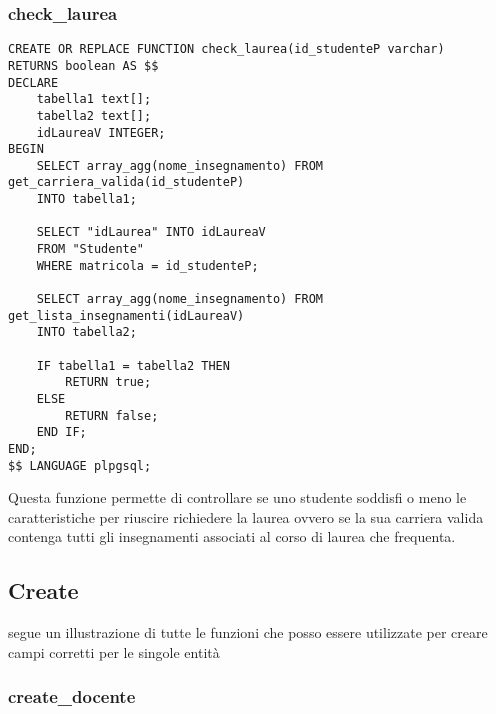 \subsubsection{check\_laurea}\label{docenteInsegnamento}
\begin{lstlisting}[style=sqlStyle]
CREATE OR REPLACE FUNCTION check_laurea(id_studenteP varchar)
RETURNS boolean AS $$
DECLARE
    tabella1 text[];
    tabella2 text[];
    idLaureaV INTEGER;
BEGIN 
    SELECT array_agg(nome_insegnamento) FROM get_carriera_valida(id_studenteP)
    INTO tabella1;
    
    SELECT "idLaurea" INTO idLaureaV
    FROM "Studente"
    WHERE matricola = id_studenteP;

    SELECT array_agg(nome_insegnamento) FROM get_lista_insegnamenti(idLaureaV)
    INTO tabella2;

    IF tabella1 = tabella2 THEN
        RETURN true;
    ELSE
        RETURN false;
    END IF;
END;
$$ LANGUAGE plpgsql;
\end{lstlisting}
Questa funzione permette di controllare se uno studente soddisfi o meno le caratteristiche per riuscire richiedere la laurea ovvero se la sua carriera valida contenga tutti gli insegnamenti associati al corso di laurea  che frequenta.


\subsection{Create}\label{create}
segue un illustrazione di tutte le funzioni che posso essere utilizzate per creare campi corretti per le singole entità 
\subsubsection{create\_docente}\label{createDocente}

